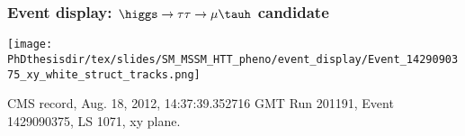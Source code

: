 \begin{frame}
\frametitle{Event display: $\higgs\to\tau\tau\to\mu\tauh$ candidate}
\vfill
\texttt{[image: \\PhDthesisdir/tex/slides/SM\_MSSM\_HTT\_pheno/event\_display/Event\_1429090375\_xy\_white\_struct\_tracks.png]}

\vfill

{\tiny
CMS record, Aug. 18, 2012, 14:37:39.352716 GMT
\qquad
Run 201191, Event 1429090375, LS 1071, xy plane.
}
\end{frame}
